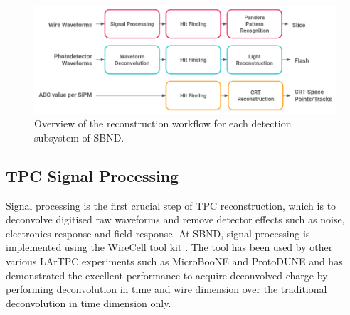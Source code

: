 \begin{figure}[htbp!] 
\centering    
\includegraphics[width=1.0\textwidth]{Reco_Workflow}
\caption[Reco_Workflow]{
Overview of the reconstruction workflow for each detection subsystem of SBND.
}
\label{fig:Reco_Workflow}
\end{figure}

\subsection{TPC Signal Processing}
Signal processing is the first crucial step of TPC reconstruction, which is to deconvolve digitised raw waveforms and remove detector effects such as noise, electronics response and field response. 
At SBND, signal processing is implemented using the WireCell tool kit \cite{wirecell}.
The tool has been used by other various LArTPC experiments such as MicroBooNE and ProtoDUNE and has demonstrated the excellent performance to acquire deconvolved charge by performing deconvolution in time and wire dimension over the traditional deconvolution in time dimension only. 

